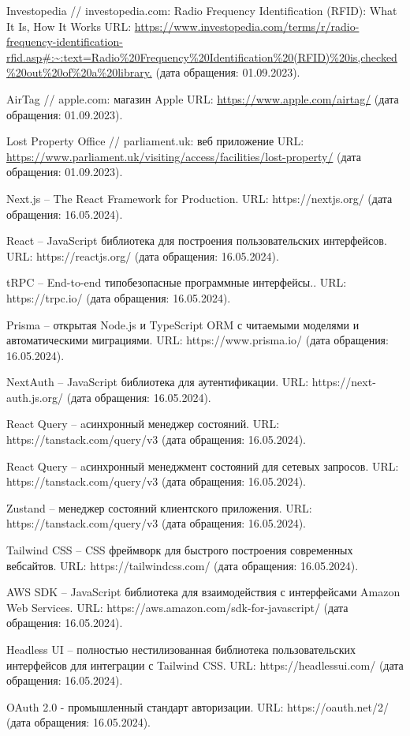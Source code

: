 \documentclass{mirea}
\begin{document}
\begin{thebibliography}{99\kern\bibindent}
	 Investopedia // investopedia.com: Radio Frequency Identification (RFID): What It Is, How It Works URL: \url{https://www.investopedia.com/terms/r/radio-frequency-identification-rfid.asp#:~:text=Radio%20Frequency%20Identification%20(RFID)%20is,checked%20out%20of%20a%20library.} (дата обращения: 01.09.2023).
	
	 AirTag // apple.com: магазин Apple URL: \url{https://www.apple.com/airtag/} (дата обращения: 01.09.2023).
	
	 Lost Property Office // parliament.uk: веб приложение URL: \url{https://www.parliament.uk/visiting/access/facilities/lost-property/} (дата обращения: 01.09.2023).
	
	 Next.js – The React Framework for Production. URL: https://nextjs.org/ (дата обращения: 16.05.2024).
	
	 React – JavaScript библиотека для построения пользовательских интерфейсов. URL: https://reactjs.org/ (дата обращения: 16.05.2024).
	
	 tRPC – End-to-end типобезопасные программные интерфейсы.. URL: https://trpc.io/ (дата обращения: 16.05.2024).
	
	 Prisma – открытая Node.js и TypeScript ORM с читаемыми моделями и автоматическими миграциями. URL: https://www.prisma.io/ (дата обращения: 16.05.2024).
	
	 NextAuth – JavaScript библиотека для аутентификации. URL: https://next-auth.js.org/ (дата обращения: 16.05.2024).
	
	 React Query – aсинхронный менеджер состояний. URL: https://tanstack.com/query/v3 (дата обращения: 16.05.2024).
	
	 React Query – aсинхронный менеджмент состояний для сетевых запросов. URL: https://tanstack.com/query/v3 (дата обращения: 16.05.2024).
	
	 Zustand – менеджер состояний клиентского приложения. URL: https://tanstack.com/query/v3 (дата обращения: 16.05.2024).
	
	 Tailwind CSS – CSS фреймворк для быстрого построения современных вебсайтов. URL: https://tailwindcss.com/ (дата обращения: 16.05.2024).
	
	 AWS SDK – JavaScript библиотека для взаимодействия с интерфейсами Amazon Web Services. URL: https://aws.amazon.com/sdk-for-javascript/ (дата обращения: 16.05.2024).
	
	 Headless UI – полностью нестилизованная библиотека пользовательских интерфейсов для интеграции с Tailwind CSS. URL: https://headlessui.com/ (дата обращения: 16.05.2024).
	
	 OAuth 2.0 - промышленный стандарт авторизации. URL: https://oauth.net/2/ (дата обращения: 16.05.2024).
\end{thebibliography}




%

	
\end{document}
